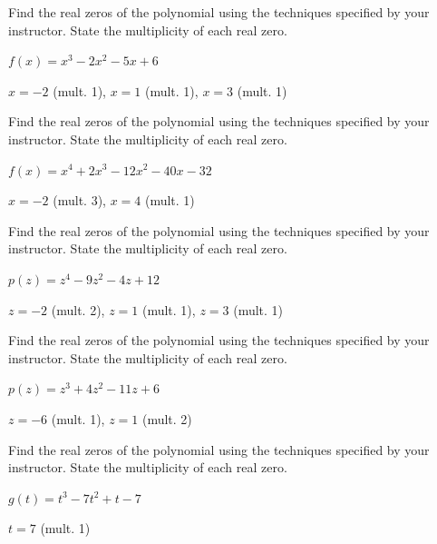 \documentclass{ximera}
\begin{document}
\begin{problem}\label{findrealzerosexerfirst}
Find the real zeros of the polynomial using the techniques specified by your instructor.  State the multiplicity of each real zero.

$f(x) = x^{3} - 2x^{2} - 5x + 6$

\begin{solution}
$x = -2$ (mult. 1), $x = 1$ (mult. 1), $x = 3$ (mult. 1)     
\end{solution}

\end{problem}

\begin{problem}
Find the real zeros of the polynomial using the techniques specified by your instructor.  State the multiplicity of each real zero.

$f(x) = x^{4} + 2x^{3} - 12x^{2} - 40x - 32$

\begin{solution}
$x = -2$ (mult. 3), $x = 4$ (mult. 1)   
\end{solution}
\end{problem}

\begin{problem}
Find the real zeros of the polynomial using the techniques specified by your instructor.  State the multiplicity of each real zero.

$p(z) = z^{4} - 9z^{2} - 4z + 12$

\begin{solution}
$z = -2$ (mult. 2), $z = 1$ (mult. 1), $z = 3$ (mult. 1)     
\end{solution}

\end{problem}

\begin{problem}
Find the real zeros of the polynomial using the techniques specified by your instructor.  State the multiplicity of each real zero.

$p(z) = z^{3} + 4z^{2} - 11z + 6$

\begin{solution}
$z = -6$ (mult. 1), $z = 1$ (mult. 2)  
\end{solution}

\end{problem}

\begin{problem}
Find the real zeros of the polynomial using the techniques specified by your instructor.  State the multiplicity of each real zero.

$g(t) = t^{3} - 7t^{2} + t - 7$

\begin{solution}
$t = 7$ (mult. 1) 
\end{solution}
\end{problem}
\end{document}
